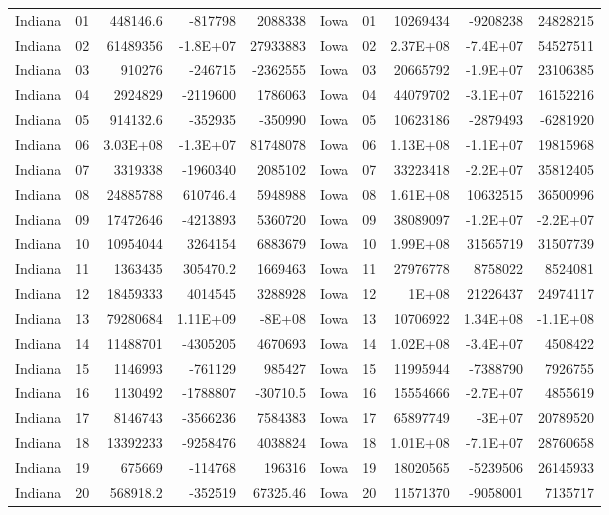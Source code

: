\begin{landscape}
\begin{singlespace}
\begin{longtable}{lrrrr|lrrrr}
		Indiana &  01  & 448146.6 & -817798 & 2088338 & Iowa &  01  & 10269434 & -9208238 & 24828215 \\
		Indiana &  02  & 61489356 & -1.8E+07 & 27933883 & Iowa &  02  & 2.37E+08 & -7.4E+07 & 54527511 \\
		Indiana &  03  & 910276 & -246715 & -2362555 & Iowa &  03  & 20665792 & -1.9E+07 & 23106385 \\
		Indiana &  04  & 2924829 & -2119600 & 1786063 & Iowa &  04  & 44079702 & -3.1E+07 & 16152216 \\
		Indiana &  05  & 914132.6 & -352935 & -350990 & Iowa &  05  & 10623186 & -2879493 & -6281920 \\
		Indiana &  06  & 3.03E+08 & -1.3E+07 & 81748078 & Iowa &  06  & 1.13E+08 & -1.1E+07 & 19815968 \\
		Indiana &  07  & 3319338 & -1960340 & 2085102 & Iowa &  07  & 33223418 & -2.2E+07 & 35812405 \\
		Indiana &  08  & 24885788 & 610746.4 & 5948988 & Iowa &  08  & 1.61E+08 & 10632515 & 36500996 \\
		Indiana &  09  & 17472646 & -4213893 & 5360720 & Iowa &  09  & 38089097 & -1.2E+07 & -2.2E+07 \\
		Indiana &  10 & 10954044 & 3264154 & 6883679 & Iowa &  10 & 1.99E+08 & 31565719 & 31507739 \\
		Indiana &  11 & 1363435 & 305470.2 & 1669463 & Iowa &  11 & 27976778 & 8758022 & 8524081 \\
		Indiana &  12 & 18459333 & 4014545 & 3288928 & Iowa &  12 & 1E+08 & 21226437 & 24974117 \\
		Indiana &  13 & 79280684 & 1.11E+09 & -8E+08 & Iowa &  13 & 10706922 & 1.34E+08 & -1.1E+08 \\
		Indiana &  14 & 11488701 & -4305205 & 4670693 & Iowa &  14 & 1.02E+08 & -3.4E+07 & 4508422 \\
		Indiana &  15 & 1146993 & -761129 & 985427 & Iowa &  15 & 11995944 & -7388790 & 7926755 \\
		Indiana &  16 & 1130492 & -1788807 & -30710.5 & Iowa &  16 & 15554666 & -2.7E+07 & 4855619 \\
		Indiana &  17 & 8146743 & -3566236 & 7584383 & Iowa &  17 & 65897749 & -3E+07 & 20789520 \\
		Indiana &  18 & 13392233 & -9258476 & 4038824 & Iowa &  18 & 1.01E+08 & -7.1E+07 & 28760658 \\
		Indiana &  19 & 675669 & -114768 & 196316 & Iowa &  19 & 18020565 & -5239506 & 26145933 \\
		Indiana &  20 & 568918.2 & -352519 & 67325.46 & Iowa &  20 & 11571370 & -9058001 & 7135717 \\

\end{longtable}
\end{singlespace}
\end{landscape}
